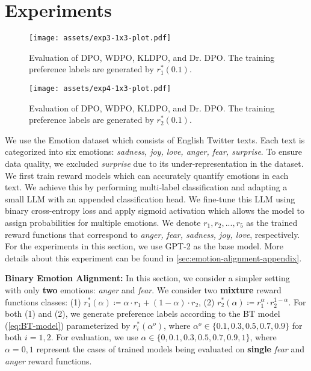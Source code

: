 \section{Experiments}\label{sec:experiments}
\begin{figure*}[!ht]
    \centering 
    \texttt{[image: assets/exp3-1x3-plot.pdf]}
    \caption{Evaluation of DPO, WDPO, KLDPO, and Dr. DPO. The training preference labels are generated by $r^*_1(0.1)$.}
    \label{fig:emotion-exp-convex-15kl-lineplot}
\end{figure*}
\begin{figure*}[!ht]
    \centering 
    \texttt{[image: assets/exp4-1x3-plot.pdf]}
    \caption{Evaluation of DPO, WDPO, KLDPO, and Dr. DPO. The training preference labels are generated by $r^*_2(0.1)$.}
    \label{fig:emotion-exp-power-15kl-lineplot}
\end{figure*}
We use the Emotion dataset \citep{saravia-etal-2018-carer} which consists of English Twitter texts. Each text is categorized into six emotions: \textit{sadness, joy, love, anger, fear, surprise}. To ensure data quality, we excluded \textit{surprise} due to its under-representation in the dataset. We first train reward models which can accurately quantify emotions in each text. We achieve this by performing multi-label classification and adapting a small LLM with an appended classification head. We fine-tune this LLM using binary cross-entropy loss and apply sigmoid activation which allows the model to assign probabilities for multiple emotions. We denote $r_1,r_2,...,r_5$ as the trained reward functions that correspond to \textit{anger, fear, sadness, joy, love}, respectively. For the experiments in this section, we use GPT-2 \citep{radford2019language} as the base model. More details about this experiment can be found in \cref{sec:emotion-alignment-appendix}.

\textbf{Binary Emotion Alignment: } In this section, we consider a simpler setting with only \textbf{two} emotions: \textit{anger} and \textit{fear}. We consider two \textbf{mixture} reward functions classes: (1) $r^*_1(\alpha)\coloneqq\alpha\cdot r_1 + (1-\alpha)\cdot r_2$, (2) $r^*_2(\alpha)\coloneqq r_1^{\alpha}\cdot r_2^{1-\alpha}$. For both (1) and (2), we generate preference labels according to the BT model (\cref{eq:BT-model}) parameterized by $r^*_i(\alpha^o)$, where $\alpha^o\in\{0.1,0.3,0.5,0.7,0.9\}$ for both $i=1,2$. For evaluation, we use $\alpha\in\{0,0.1,0.3,0.5,0.7,0.9,1\}$, where $\alpha=0,1$ represent the cases of trained models being evaluated on \textbf{single} \textit{fear} and \textit{anger} reward functions. 


